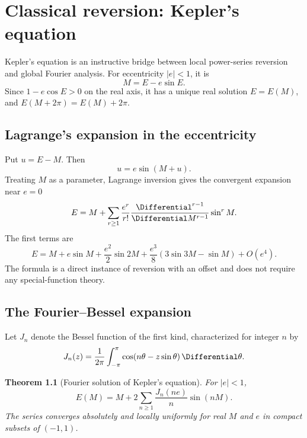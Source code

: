 \documentclass[11pt,a4paper,oneside,openany]{book}
\newtheorem{theorem}{Theorem}[chapter]
\theoremstyle{definition}
\theoremstyle{remark}
\begin{document}
\chapter{Classical reversion: Kepler's equation}
\label{ch:kepler}

Kepler's equation is an instructive bridge between local power-series reversion
and global Fourier analysis.  For eccentricity $|e|<1$, it is
\begin{equation}
 M=E-e\sin E.
 \label{new:eq:kepler}
\end{equation}
Since $1-e\cos E>0$ on the real axis, it has a unique real solution $E=E(M)$,
and $E(M+2\pi)=E(M)+2\pi$.

\section{Lagrange's expansion in the eccentricity}

Put $u=E-M$.  Then
\[
 u=e\sin(M+u).
\]
Treating $M$ as a parameter, Lagrange inversion gives the convergent expansion
near $e=0$
\begin{equation}
 E=M+\sum_{r\ge1}\frac{e^r}{r!}
 \frac{\Differential^{r-1}}{\Differential M^{r-1}}\sin^r M.
 \label{new:eq:kepler-lagrange}
\end{equation}
The first terms are
\[
 E=M+e\sin M+\frac{e^2}{2}\sin2M
 +\frac{e^3}{8}(3\sin3M-\sin M)+O(e^4).
\]
The formula is a direct instance of reversion with an offset and does not
require any special-function theory.

\section{The Fourier--Bessel expansion}

Let $J_n$ denote the Bessel function of the first kind, characterized for
integer $n$ by
\begin{equation}
 J_n(z)=\frac1{2\pi}\int_{-\pi}^{\pi}
 \cos(n\theta-z\sin\theta)\,\Differential\theta.
 \label{new:eq:bessel-integral}
\end{equation}

\begin{theorem}[Fourier solution of Kepler's equation]
For $|e|<1$,
\begin{equation}
 E(M)=M+2\sum_{n\ge1}\frac{J_n(ne)}{n}\sin(nM).
 \label{new:eq:kepler-bessel}
\end{equation}
The series converges absolutely and locally uniformly for real $M$ and
$e$ in compact subsets of $(-1,1)$.
\end{theorem}
\end{document}
